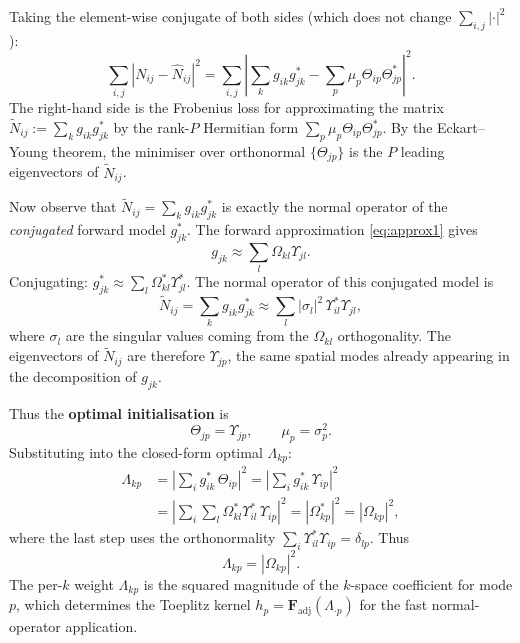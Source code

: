 \documentclass{article}
\begin{document}
Taking the element-wise conjugate of both sides (which does not change $\sum_{i,j}|\cdot|^2$):
\begin{equation}
    \sum_{i,j}|N_{ij} - \hat{N}_{ij}|^2
    = \sum_{i,j}\left|\sum_k g_{ik}g^*_{jk} - \sum_p \mu_p \Theta_{ip}\Theta^*_{jp}\right|^2.
    \label{eq:svd_equiv_loss}
\end{equation}
The right-hand side is the Frobenius loss for approximating the matrix
$\tilde{N}_{ij} := \sum_k g_{ik}g^*_{jk}$
by the rank-$P$ Hermitian form $\sum_p \mu_p \Theta_{ip}\Theta^*_{jp}$.
By the Eckart--Young theorem, the minimiser over orthonormal $\{\Theta_{jp}\}$ is
the $P$ leading eigenvectors of $\tilde{N}_{ij}$.

Now observe that $\tilde{N}_{ij} = \sum_k g_{ik}g^*_{jk}$ is exactly the normal operator
of the \emph{conjugated} forward model $g^*_{jk}$.
The forward approximation \eqref{eq:approx1} gives
\begin{equation}
    g_{jk} \approx \sum_l \Omega_{kl}\Upsilon_{jl}.
\end{equation}
Conjugating: $g^*_{jk} \approx \sum_l \Omega^*_{kl}\Upsilon^*_{jl}$.
The normal operator of this conjugated model is
\begin{equation}
    \tilde{N}_{ij} = \sum_k g_{ik}g^*_{jk}
    \approx \sum_l |\sigma_l|^2\, \Upsilon^*_{il}\Upsilon_{jl},
\end{equation}
where $\sigma_l$ are the singular values coming from the $\Omega_{kl}$ orthogonality.
The eigenvectors of $\tilde{N}_{ij}$ are therefore $\Upsilon_{jp}$,
the same spatial modes already appearing in the decomposition of $g_{jk}$.

Thus the \textbf{optimal initialisation} is
\begin{equation}
    \Theta_{jp} = \Upsilon_{jp}, \qquad \mu_p = \sigma_p^2.
    \label{eq:svd_init}
\end{equation}
Substituting into the closed-form optimal $\Lambda_{kp}$:
\begin{equation}
\begin{split}
    \Lambda_{kp} &= \left|\sum_i g^*_{ik}\,\Theta_{ip}\right|^2
    = \left|\sum_i g^*_{ik}\,\Upsilon_{ip}\right|^2 \\
    &= \left|\sum_i \sum_l \Omega^*_{kl}\Upsilon^*_{il}\,\Upsilon_{ip}\right|^2
    = \left|\Omega^*_{kp}\right|^2 = |\Omega_{kp}|^2,
\end{split}
\end{equation}
where the last step uses the orthonormality $\sum_i\Upsilon^*_{il}\Upsilon_{ip}=\delta_{lp}$.
Thus
\begin{equation}
    \Lambda_{kp} = |\Omega_{kp}|^2.
    \label{eq:lambda_svd}
\end{equation}
The per-$k$ weight $\Lambda_{kp}$ is the squared magnitude of the $k$-space coefficient
for mode $p$, which determines the Toeplitz kernel
$h_p = \mathbf{F}_{\mathrm{adj}}(\Lambda_{\cdot p})$ for the fast normal-operator application.
\end{document}
